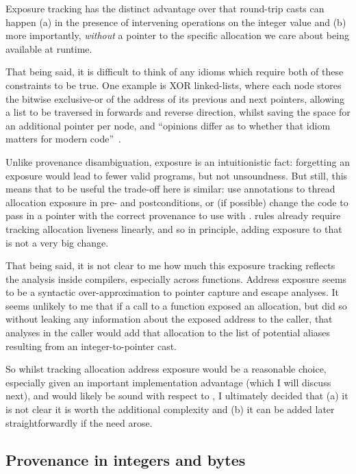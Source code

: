 Exposure tracking has the distinct advantage over  that round-trip
casts can happen (a) in the presence of intervening operations on the integer
value and (b) more importantly, \emph{without} a pointer to the specific
allocation we care about being available at runtime.

That being said, it is difficult to think of any idioms which require both of
these constraints to be true. One example is XOR linked-lists, where each node
stores the bitwise exclusive-or of the address of its previous and next
pointers, allowing a list to be traversed in forwards and reverse direction,
whilst saving the space for an additional pointer per node, and ``opinions
differ as to whether that idiom matters for modern
code''~.

Unlike provenance disambiguation, exposure is an intuitionistic fact:
forgetting an exposure would lead to fewer valid programs, but not
unsoundness. But still, this means that to be useful the trade-off here is
similar: use annotations to thread allocation exposure in pre- and
postconditions, or (if possible) change the code to pass in a pointer with the
correct provenance to use with .  rules
already require tracking allocation liveness linearly, and so in principle,
adding exposure to that is not a very big change.

That being said, it is not clear to me how much this exposure tracking reflects
the analysis inside compilers, especially across functions. Address exposure
seems to be a syntactic over-approximation to pointer capture and escape
analyses.
It seems unlikely to me that if a call to a function exposed an
allocation, but did so without leaking any information about the exposed
address to the caller, that analyses in the caller would add that allocation to
the list of potential aliases resulting from an integer-to-pointer cast.

So whilst tracking allocation address exposure would be a reasonable choice,
especially given an important implementation advantage (which I will discuss
next), and would likely be sound with respect to , I ultimately
decided that (a) it is not clear it is worth the additional complexity and (b)
it can be added later straightforwardly if the need arose.

\subsection{Provenance in integers and bytes}\label{subsec:prov-int-bytes}

